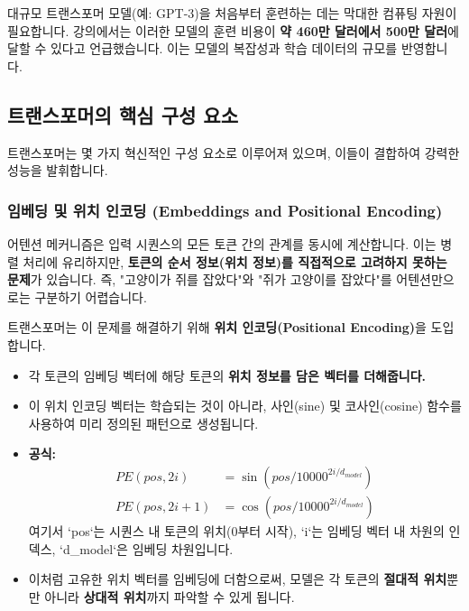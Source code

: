 \documentclass[11pt,a4paper]{article}
\begin{document}
\begin{warningbox}[title={트랜스포머 학습 비용}]
대규모 트랜스포머 모델(예: GPT-3)을 처음부터 훈련하는 데는 막대한 컴퓨팅 자원이 필요합니다. 강의에서는 이러한 모델의 훈련 비용이 \textbf{약 460만 달러에서 500만 달러}에 달할 수 있다고 언급했습니다. 이는 모델의 복잡성과 학습 데이터의 규모를 반영합니다.
\end{warningbox}

\subsection{트랜스포머의 핵심 구성 요소}
트랜스포머는 몇 가지 혁신적인 구성 요소로 이루어져 있으며, 이들이 결합하여 강력한 성능을 발휘합니다.

\subsubsection{임베딩 및 위치 인코딩 (Embeddings and Positional Encoding)}
\begin{conceptbox}[title={문제점: 어텐션의 순서 정보 부족}]
어텐션 메커니즘은 입력 시퀀스의 모든 토큰 간의 관계를 동시에 계산합니다. 이는 병렬 처리에 유리하지만, \textbf{토큰의 순서 정보(위치 정보)를 직접적으로 고려하지 못하는 문제}가 있습니다. 즉, "고양이가 쥐를 잡았다"와 "쥐가 고양이를 잡았다"를 어텐션만으로는 구분하기 어렵습니다.
\end{conceptbox}

\begin{summarybox}[title={해결책: 위치 인코딩 (Positional Encoding)}]
트랜스포머는 이 문제를 해결하기 위해 \textbf{위치 인코딩(Positional Encoding)}을 도입합니다.
\begin{itemize}
    \item 각 토큰의 임베딩 벡터에 해당 토큰의 \textbf{위치 정보를 담은 벡터를 더해줍니다.}
    \item 이 위치 인코딩 벡터는 학습되는 것이 아니라, 사인(sine) 및 코사인(cosine) 함수를 사용하여 미리 정의된 패턴으로 생성됩니다.
    \item \textbf{공식:}
    \begin{align*}
        PE(pos, 2i) &= \sin(pos / 10000^{2i/d_{model}}) \\
        PE(pos, 2i+1) &= \cos(pos / 10000^{2i/d_{model}})
    \end{align*}
    여기서 `pos`는 시퀀스 내 토큰의 위치(0부터 시작), `i`는 임베딩 벡터 내 차원의 인덱스, `d_model`은 임베딩 차원입니다.
    \item 이처럼 고유한 위치 벡터를 임베딩에 더함으로써, 모델은 각 토큰의 \textbf{절대적 위치}뿐만 아니라 \textbf{상대적 위치}까지 파악할 수 있게 됩니다.
\end{itemize}
\end{summarybox}
\end{document}
